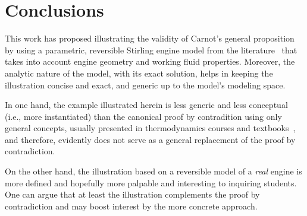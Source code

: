 \section{Conclusions}

    This   work   has   proposed    illustrating    the    validity    of    Carnot's    general
    proposition~\cite{1897-ThurstonRH-Wiley} by using a parametric, reversible  Stirling  engine
    model from the literature~\cite{2012-ChengCH+YangHS-ApEnergy} that takes into account engine
    geometry and working fluid properties. Moreover, the analytic nature of the model, with  its
    exact solution, helps in keeping the illustration concise and exact, and generic up  to  the
    model's modeling space.

    In one hand, the example illustrated herein is less generic and less conceptual (i.e.,  more
    instantiated) than the canonical proof by contradition using only general concepts,  usually
    presented  in   thermodynamics   courses   and   textbooks~\cite{2013-CengelYA+BolesMA-AMGH,
    2002-MoranMJ+ShapiroHN-LTC, 1986-JonesJB+HawkinsGA-Wiley}, and therefore, evidently does not
    serve as a general replacement of the proof by contradiction.

    On the other hand, the illustration based on a reversible model of a \emph{real}  engine  is
    more defined and hopefully more palpable and interesting  to  inquiring  students.  One  can
    argue that at least the illustration complements the proof by contradiction  and  may  boost
    interest by the more concrete approach.


